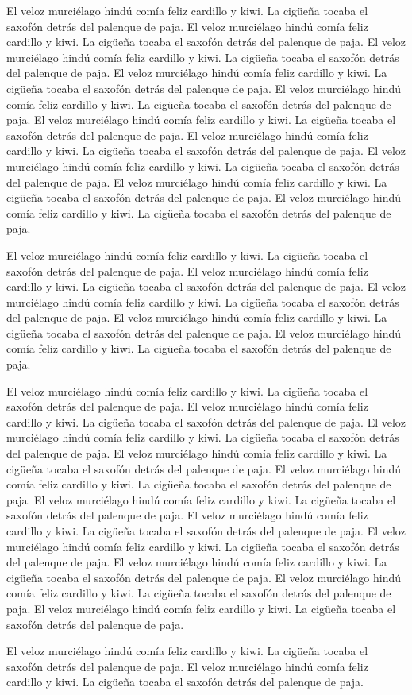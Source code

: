 \documentclass[a4paper,11pt,oneside]{article}
\begin{document}
El veloz murciélago hindú comía feliz cardillo y kiwi. La cigüeña tocaba el
saxofón detrás del palenque de paja.
El veloz murciélago hindú comía feliz cardillo y kiwi. La cigüeña tocaba el
saxofón detrás del palenque de paja.
El veloz murciélago hindú comía feliz cardillo y kiwi. La cigüeña tocaba el
saxofón detrás del palenque de paja.
El veloz murciélago hindú comía feliz cardillo y kiwi. La cigüeña tocaba el
saxofón detrás del palenque de paja.
El veloz murciélago hindú comía feliz cardillo y kiwi. La cigüeña tocaba el
saxofón detrás del palenque de paja.
El veloz murciélago hindú comía feliz cardillo y kiwi. La cigüeña tocaba el
saxofón detrás del palenque de paja.
El veloz murciélago hindú comía feliz cardillo y kiwi. La cigüeña tocaba el
saxofón detrás del palenque de paja.
El veloz murciélago hindú comía feliz cardillo y kiwi. La cigüeña tocaba el
saxofón detrás del palenque de paja.
El veloz murciélago hindú comía feliz cardillo y kiwi. La cigüeña tocaba el
saxofón detrás del palenque de paja.
El veloz murciélago hindú comía feliz cardillo y kiwi. La cigüeña tocaba el
saxofón detrás del palenque de paja.

El veloz murciélago hindú comía feliz cardillo y kiwi. La cigüeña tocaba el
saxofón detrás del palenque de paja.
El veloz murciélago hindú comía feliz cardillo y kiwi. La cigüeña tocaba el
saxofón detrás del palenque de paja.
El veloz murciélago hindú comía feliz cardillo y kiwi. La cigüeña tocaba el
saxofón detrás del palenque de paja.
El veloz murciélago hindú comía feliz cardillo y kiwi. La cigüeña tocaba el
saxofón detrás del palenque de paja.
El veloz murciélago hindú comía feliz cardillo y kiwi. La cigüeña tocaba el
saxofón detrás del palenque de paja.

El veloz murciélago hindú comía feliz cardillo y kiwi. La cigüeña tocaba el
saxofón detrás del palenque de paja.
El veloz murciélago hindú comía feliz cardillo y kiwi. La cigüeña tocaba el
saxofón detrás del palenque de paja.
El veloz murciélago hindú comía feliz cardillo y kiwi. La cigüeña tocaba el
saxofón detrás del palenque de paja.
El veloz murciélago hindú comía feliz cardillo y kiwi. La cigüeña tocaba el
saxofón detrás del palenque de paja.
El veloz murciélago hindú comía feliz cardillo y kiwi. La cigüeña tocaba el
saxofón detrás del palenque de paja.
El veloz murciélago hindú comía feliz cardillo y kiwi. La cigüeña tocaba el
saxofón detrás del palenque de paja.
El veloz murciélago hindú comía feliz cardillo y kiwi. La cigüeña tocaba el
saxofón detrás del palenque de paja.
El veloz murciélago hindú comía feliz cardillo y kiwi. La cigüeña tocaba el
saxofón detrás del palenque de paja.
El veloz murciélago hindú comía feliz cardillo y kiwi. La cigüeña tocaba el
saxofón detrás del palenque de paja.
El veloz murciélago hindú comía feliz cardillo y kiwi. La cigüeña tocaba el
saxofón detrás del palenque de paja.
El veloz murciélago hindú comía feliz cardillo y kiwi. La cigüeña tocaba el
saxofón detrás del palenque de paja.

El veloz murciélago hindú comía feliz cardillo y kiwi. La cigüeña tocaba el
saxofón detrás del palenque de paja.
El veloz murciélago hindú comía feliz cardillo y kiwi. La cigüeña tocaba el
saxofón detrás del palenque de paja.
\end{document}
